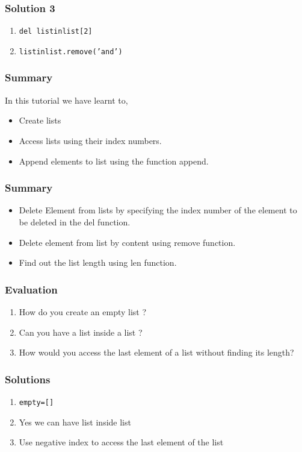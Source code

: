 \documentclass[17pt]{beamer}
\begin{document}
\begin{frame}[fragile]
\frametitle{Solution 3}
\begin{enumerate}
\item \texttt{del listinlist[2]}
\item \texttt{listinlist.remove('and')}
\end{enumerate}
\end{frame}
\begin{frame}[fragile]
	\frametitle{Summary}
	In this tutorial we have learnt to,
    \begin{itemize}
        \item Create lists\pause
        \item Access lists using their index numbers.\pause
        \item Append elements to list using the function append.
	\end{itemize}
\end{frame}
\begin{frame}[fragile]
	\frametitle{Summary}
\begin{itemize}
          \item Delete Element from lists by specifying the index number of the element to be deleted in the del function.\pause
          \item Delete element from list by content using remove function.\pause
          \item Find out the list length using len function.
\end{itemize}
\end{frame}
\begin{frame}[fragile]
	\frametitle{Evaluation}
	\begin{enumerate}
        \item How do you create an empty list ?\pause
        \vspace{8pt}
        \item Can you have a list inside a list ?\pause
        \vspace{8pt}
        \item How would you access the last element of a list without finding its length?
    \end{enumerate}
\end{frame}
\begin{frame}[fragile]
	\frametitle{Solutions}
	\begin{enumerate}
        \item \texttt{empty=[]}\pause
        \vspace{8pt}
        \item Yes we can have list inside list\\\pause
        \vspace{8pt}
        \item Use negative index to access the last element of the list
    \end{enumerate}
\end{frame}
\end{document}
